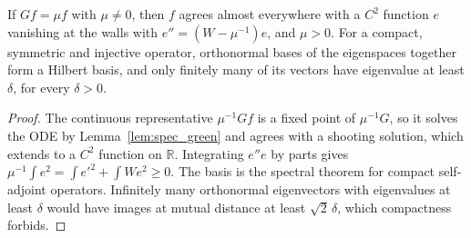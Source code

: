 \begin{lemma}
  \label{lem:spec_basis}
  \leanok
  If $Gf=\mu f$ with $\mu\neq0$, then $f$ agrees almost everywhere with a $C^2$ function $e$ vanishing at the walls
  with $e''=(W-\mu^{-1})e$, and $\mu>0$. For a compact, symmetric and injective operator, orthonormal bases of the
  eigenspaces together form a Hilbert basis, and only finitely many of its vectors have eigenvalue at least $\delta$,
  for every $\delta>0$.
\end{lemma}
\begin{proof}
  \leanok
  The continuous representative $\mu^{-1}Gf$ is a fixed point of $\mu^{-1}G$, so it solves the ODE by
  Lemma~\ref{lem:spec_green} and agrees with a shooting solution, which extends to a $C^2$ function on $\mathbb R$.
  Integrating $e''e$ by parts gives $\mu^{-1}\int e^2=\int e'^2+\int We^2\ge0$. The basis is the spectral theorem for
  compact self-adjoint operators. Infinitely many orthonormal eigenvectors with eigenvalues at least $\delta$ would
  have images at mutual distance at least $\sqrt2\,\delta$, which compactness forbids.
\end{proof}

